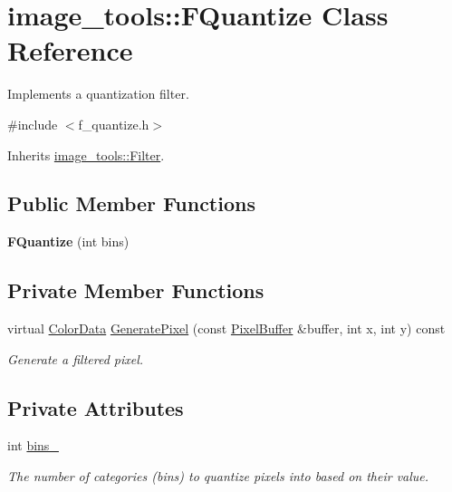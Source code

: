 \hypertarget{classimage__tools_1_1FQuantize}{}\section{image\+\_\+tools\+:\+:F\+Quantize Class Reference}
\label{classimage__tools_1_1FQuantize}


Implements a quantization filter.  




{\ttfamily \#include $<$f\+\_\+quantize.\+h$>$}



Inherits \hyperlink{classimage__tools_1_1Filter}{image\+\_\+tools\+::\+Filter}.

\subsection*{Public Member Functions}
\begin{DoxyCompactItemize}
\item 
{\bfseries F\+Quantize} (int bins)\hypertarget{classimage__tools_1_1FQuantize_a449e80031ef13d39fc29c8d2a450a4bb}{}\label{classimage__tools_1_1FQuantize_a449e80031ef13d39fc29c8d2a450a4bb}

\end{DoxyCompactItemize}
\subsection*{Private Member Functions}
\begin{DoxyCompactItemize}
\item 
virtual \hyperlink{classimage__tools_1_1ColorData}{Color\+Data} \hyperlink{classimage__tools_1_1FQuantize_a85066b63bff848dd4320501a3b79c7d6}{Generate\+Pixel} (const \hyperlink{classimage__tools_1_1PixelBuffer}{Pixel\+Buffer} \&buffer, int x, int y) const 
\begin{DoxyCompactList}\small\item\em Generate a filtered pixel. \end{DoxyCompactList}\end{DoxyCompactItemize}
\subsection*{Private Attributes}
\begin{DoxyCompactItemize}
\item 
int \hyperlink{classimage__tools_1_1FQuantize_a5378d59c5c3d85066a69eb05f138a56d}{bins\+\_\+}\hypertarget{classimage__tools_1_1FQuantize_a5378d59c5c3d85066a69eb05f138a56d}{}\label{classimage__tools_1_1FQuantize_a5378d59c5c3d85066a69eb05f138a56d}

\begin{DoxyCompactList}\small\item\em The number of categories (bins) to quantize pixels into based on their value. \end{DoxyCompactList}\end{DoxyCompactItemize}


